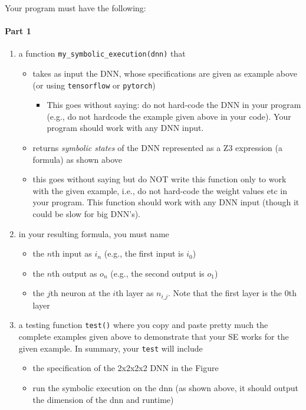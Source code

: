 Your program must have the following:

\paragraph{Part 1}

\begin{enumerate}
\item a function \texttt{my\_symbolic\_execution(dnn)} that 
    \begin{itemize}
    \item takes as input the DNN, whose specifications are given as example above (or using \texttt{tensorflow} or \texttt{pytorch})
        \begin{itemize}
        \item This goes without saying: do not hard-code the DNN in your program (e.g., do not hardcode the example given above in your code).  Your program should work with any DNN input.
        \end{itemize}
    \item returns \textit{symbolic states} of the DNN represented as a Z3 expression (a formula) as shown above
    \item this goes without saying but do NOT write this function only to work with the given example, i.e., do not hard-code the weight values etc in your program. This function should work with any DNN input (though it could be slow for big DNN's).
    \end{itemize}
\item in your resulting formula, you must name 
    \begin{itemize}
    \item the $n$th input  as $i_n$ (e.g., the first input is $i_0$)
    \item the $n$th output as $o_n$ (e.g., the second output is $o_1$)
    \item the $j$th neuron at the $i$th layer as $n_{i\_j}$.  Note that the first layer is the $0$th layer
    \end{itemize}
\item a testing function \texttt{test()} where you copy and paste pretty much the complete examples given above to demonstrate that your SE works for the given example. In summary, your \texttt{test} will include
    \begin{itemize}
    \item the specification of the 2x2x2x2 DNN in the Figure
    \item run the symbolic execution on the dnn  (as shown above, it should output the dimension of the dnn and runtime)

\end{itemize}
\end{enumerate}
